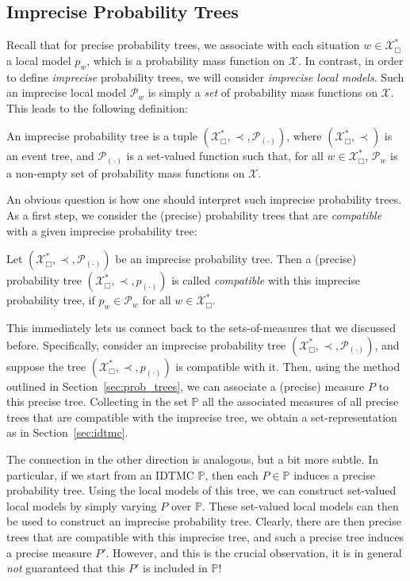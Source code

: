 \documentclass[graybox]{svmult}
\newcommand{\states}{\mathcal{X}}
\begin{document}
\subsection{Imprecise Probability Trees}\label{sec:imprecise_prob_tree}
Recall that for precise probability trees, we associate with each situation $w\in\states^*_\Box$ a local model $p_w$, which is a probability mass function on $\states$. In contrast, in order to define \emph{imprecise} probability trees, we will consider \emph{imprecise local models}. Such an imprecise local model $\mathcal{P}_w$ is simply a \emph{set} of probability mass functions on $\states$. This leads to the following definition:
\begin{definition}
An imprecise probability tree is a tuple $(\states^*_\Box,\prec,\mathcal{P}_{(\cdot)})$, where $(\states^*_\Box,\prec)$ is an event tree, and $\mathcal{P}_{(\cdot)}$ is a set-valued function such that, for all $w\in\states^*_\Box$, $\mathcal{P}_w$ is a non-empty set of probability mass functions on $\states$.
\end{definition}
An obvious question is how one should interpret such imprecise probability trees. As a first step, we consider the (precise) probability trees that are \emph{compatible} with a given imprecise probability tree:
\begin{definition}
Let $(\states^*_\Box,\prec,\mathcal{P}_{(\cdot)})$ be an imprecise probability tree. Then a (precise) probability tree $(\states^*_\Box,\prec,p_{(\cdot)})$ is called \emph{compatible} with this imprecise probability tree, if $p_w\in\mathcal{P}_w$ for all $w\in \states^*_\Box$.
\end{definition}

This immediately lets us connect back to the sets-of-measures that we discussed before. Specifically, consider an imprecise probability tree $(\states^*_\Box,\prec,\mathcal{P}_{(\cdot)})$, and suppose the tree $(\states^*_\Box,\prec,p_{(\cdot)})$ is compatible with it. Then, using the method outlined in Section~\ref{sec:prob_trees}, we can associate a (precise) measure $P$ to this precise tree. Collecting in the set $\mathbb{P}$ all the associated measures of all precise trees that are compatible with the imprecise tree, we obtain a set-representation as in Section~\ref{sec:idtmc}. 

The connection in the other direction is analogous, but a bit more subtle. In particular, if we start from an IDTMC $\mathbb{P}$, then each $P\in\mathbb{P}$ induces a precise probability tree. Using the local models of this tree, we can construct set-valued local models by simply varying $P$ over $\mathbb{P}$. These set-valued local models can then be used to construct an imprecise probability tree. Clearly, there are then precise trees that are compatible with this imprecise tree, and such a precise tree induces a precise measure $P'$. However, and this is the crucial observation, it is in general \emph{not} guaranteed that this $P'$ is included in $\mathbb{P}$! 
\end{document}
